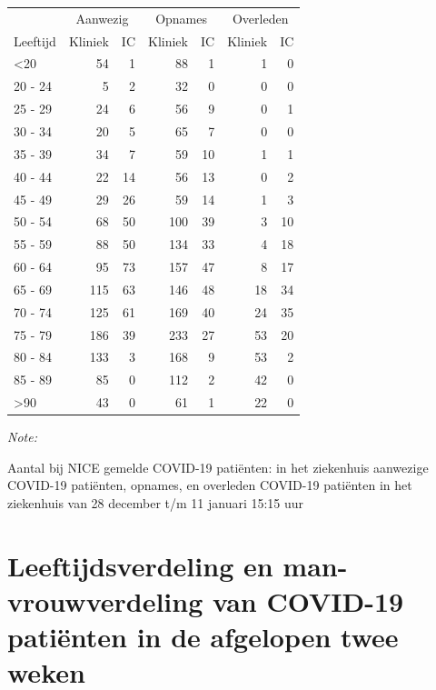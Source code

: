 \documentclass[
  english,
  man,floatsintext]{apa6}
\begin{document}
\begin{table}
\centering\begingroup\fontsize{10}{12}\selectfont

\begin{threeparttable}
\begin{tabular}{lrrrrrr}
\toprule
\multicolumn{1}{c}{ } & \multicolumn{2}{c}{Aanwezig} & \multicolumn{2}{c}{Opnames} & \multicolumn{2}{c}{Overleden} \\
\cmidrule(l{3pt}r{3pt}){2-3} \cmidrule(l{3pt}r{3pt}){4-5} \cmidrule(l{3pt}r{3pt}){6-7}
Leeftijd & Kliniek & IC & Kliniek & IC & Kliniek & IC\\
\midrule
<20 & 54 & 1 & 88 & 1 & 1 & 0\\
20 - 24 & 5 & 2 & 32 & 0 & 0 & 0\\
25 - 29 & 24 & 6 & 56 & 9 & 0 & 1\\
30 - 34 & 20 & 5 & 65 & 7 & 0 & 0\\
35 - 39 & 34 & 7 & 59 & 10 & 1 & 1\\
40 - 44 & 22 & 14 & 56 & 13 & 0 & 2\\
45 - 49 & 29 & 26 & 59 & 14 & 1 & 3\\
50 - 54 & 68 & 50 & 100 & 39 & 3 & 10\\
55 - 59 & 88 & 50 & 134 & 33 & 4 & 18\\
60 - 64 & 95 & 73 & 157 & 47 & 8 & 17\\
65 - 69 & 115 & 63 & 146 & 48 & 18 & 34\\
70 - 74 & 125 & 61 & 169 & 40 & 24 & 35\\
75 - 79 & 186 & 39 & 233 & 27 & 53 & 20\\
80 - 84 & 133 & 3 & 168 & 9 & 53 & 2\\
85 - 89 & 85 & 0 & 112 & 2 & 42 & 0\\
>90 & 43 & 0 & 61 & 1 & 22 & 0\\
\bottomrule
\end{tabular}
\begin{tablenotes}
\item \textit{Note: } 
\item Aantal bij NICE gemelde COVID-19 patiënten: in het ziekenhuis aanwezige COVID-19 patiënten, opnames, en overleden COVID-19 patiënten in het ziekenhuis van 28 december t/m 11 januari 15:15 uur
\end{tablenotes}
\end{threeparttable}
\endgroup{}
\end{table}

\newpage

\hypertarget{leeftijdsverdeling-en-man-vrouwverdeling-van-covid-19-patiuxebnten-in-de-afgelopen-twee-weken}{%
\section{Leeftijdsverdeling en man-vrouwverdeling van COVID-19 patiënten in de afgelopen twee weken}\label{leeftijdsverdeling-en-man-vrouwverdeling-van-covid-19-patiuxebnten-in-de-afgelopen-twee-weken}}
\end{document}
